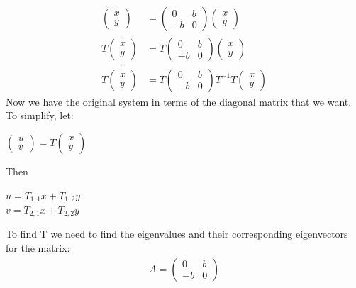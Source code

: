 \documentclass[10pt]{article}
\begin{document}
\begin{align*}
\dot{\begin{pmatrix}x\\y\end{pmatrix}}&=\begin{pmatrix}0&b\\-b&0\end{pmatrix}\begin{pmatrix}x\\y\end{pmatrix}\\
T\dot{\begin{pmatrix}x\\y\end{pmatrix}}&=T\begin{pmatrix}0&b\\-b&0\end{pmatrix}\begin{pmatrix}x\\y\end{pmatrix}\\
T\dot{\begin{pmatrix}x\\y\end{pmatrix}}&=T\begin{pmatrix}0&b\\-b&0\end{pmatrix}T^{-1}T\begin{pmatrix}x\\y\end{pmatrix}
\end{align*}
Now we have the original system in terms of the diagonal matrix that we want. To simplify, let: 
\begin{center}
$\begin{pmatrix}u\\v\end{pmatrix}=T\begin{pmatrix}x\\y\end{pmatrix}$
\end{center}
Then
\begin{center}
$u = T_{1,1}x + T_{1,2}y$\\
$v = T_{2,1}x + T_{2,2}y$
\end{center}
To find T we need to find the eigenvalues and their corresponding eigenvectors for the matrix:
\begin{align*}
A = \begin{pmatrix}0&b\\-b&0\end{pmatrix}
\end{align*}
\end{document}
